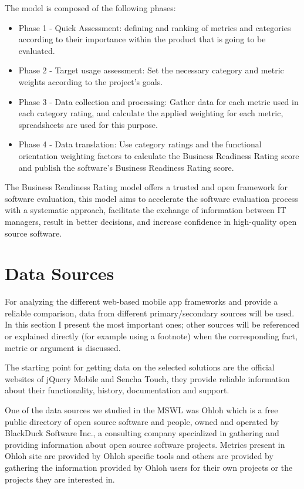 \documentclass[a4paper,12pt]{book}
\begin{document}
The model is composed of the following phases:
\begin{itemize}
\item Phase 1 - Quick Assessment: defining and ranking of metrics and categories according to their importance within the product that is going to be evaluated.
\item Phase 2 - Target usage assessment: Set the necessary category and metric weights according to the project's goals.
\item Phase 3 - Data collection and processing: Gather data for each metric used in each category rating, and calculate the applied weighting for each metric, spreadsheets are used for this purpose.
\item Phase 4 - Data translation: Use category ratings and the functional orientation weighting factors to calculate the Business Readiness Rating score and publish the software’s Business Readiness Rating score.
\end{itemize}

The Business Readiness Rating model offers a trusted and open framework for software evaluation, this model aims to accelerate the software evaluation process with a systematic approach, facilitate the exchange of information between IT managers, result in better decisions, and increase confidence in high-quality open source software.

\section{Data Sources}
\label{sec:data}

For analyzing the different web-based mobile app frameworks and provide a reliable comparison, data from different primary/secondary sources will be used. In this section I present the most important ones; other sources will be referenced or explained directly (for example using a footnote) when the corresponding fact, metric or argument is discussed.

The starting point for getting data on the selected solutions are the official websites of jQuery Mobile\cite{jquery} and Sencha Touch\cite{sencha}, they provide reliable information about their functionality, history, documentation and support. 

One of the data sources we studied in the MSWL was Ohloh\cite{Ohloh} which is a free public
directory of open source software and people, owned and operated by BlackDuck Software Inc., a consulting company specialized in gathering and providing information about open source software projects. Metrics present in Ohloh site are provided by Ohloh specific tools and others are provided by gathering the information provided by Ohloh users for their own projects or the projects they are interested in.
\end{document}

